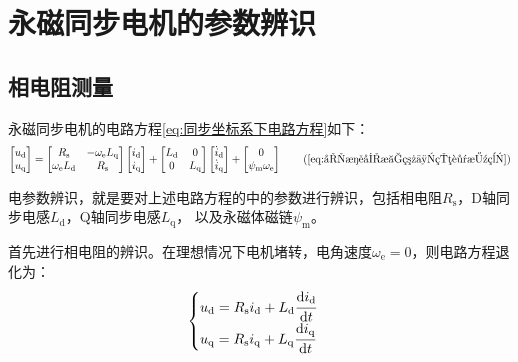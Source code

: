 
\newpage
\section{永磁同步电机的参数辨识}

\subsection{相电阻测量}
永磁同步电机的电路方程\eqref{eq:同步坐标系下电路方程}如下：
\begin{equation}
    \begin{bmatrix}
        u_{\mathrm{d}}\\u_{\mathrm{q}}
    \end{bmatrix}
    =\begin{bmatrix}R_{\mathrm{s}}&-\omega_{\mathrm{e}}L_{\mathrm{q}}\\\omega_{\mathrm{e}}L_{\mathrm{d}}&R_{\mathrm{s}}\end{bmatrix}
    \begin{bmatrix}i_{\mathrm{d}}\\i_{\mathrm{q}}\end{bmatrix}
    +\begin{bmatrix}L_{\mathrm{d}}&0\\0&L_{\mathrm{q}}\end{bmatrix}
    \begin{bmatrix}\dot{i}_{\mathrm{d}}\\\dot{i}_{\mathrm{q}}\end{bmatrix}
    +\begin{bmatrix}0\\\psi_{\mathrm{m}}\omega_{\mathrm{e}}\end{bmatrix}
    \tag{\ref{eq:同步坐标系下电路方程}}
\end{equation}

电参数辨识，就是要对上述电路方程的中的参数进行辨识，包括相电阻\(R_{\mathrm{s}}\)，D轴同步电感\(L_{\mathrm{d}}\)，Q轴同步电感\(L_{\mathrm{q}}\)，
以及永磁体磁链\(\psi_{\mathrm{m}}\)。

首先进行相电阻的辨识。在理想情况下电机堵转，电角速度\(\omega_{\mathrm{e}}=0\)，则电路方程退化为：
\begin{equation*}
    \begin{cases}
        u_{\mathrm{d}} = R_{\mathrm{s}}i_{\mathrm{d}}+L_{\mathrm{d}}\cfrac{\mathrm{d} i_{\mathrm{d}}}{\mathrm{d} t}\\
        u_{\mathrm{q}} = R_{\mathrm{s}}i_{\mathrm{q}}+L_{\mathrm{q}}\cfrac{\mathrm{d} i_{\mathrm{q}}}{\mathrm{d} t}
    \end{cases}
\end{equation*}

